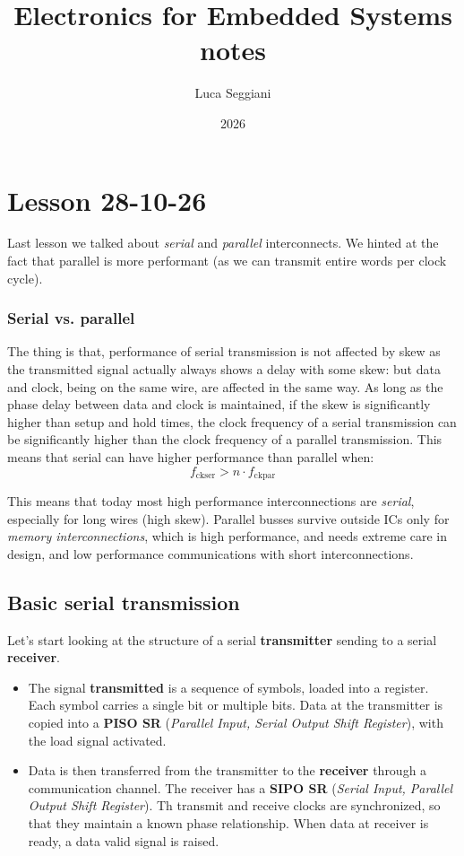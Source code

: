 \documentclass[a4paper,11pt]{article}
\title{Electronics for Embedded Systems notes}
\author{Luca Seggiani}
\date{2026}
\begin{document}
\section{Lesson 28-10-26}

\thispagestyle{empty}
\pagestyle{fancy}

Last lesson we talked about \textit{serial} and \textit{parallel} interconnects.
We hinted at the fact that parallel is more performant (as we can transmit entire words per clock cycle).

\subsubsection{Serial vs. parallel}

The thing is that, performance of serial transmission is not affected by skew as the transmitted signal actually always shows a delay with some skew: but data and clock, being on the same wire, are affected in the same way.
As long as the phase delay between data and clock is maintained, if the skew is significantly higher than setup and hold times, the clock frequency of a serial transmission can be significantly higher than the clock frequency of a parallel transmission.
This means that serial can have higher performance than parallel when:
$$
	f_\text{ckser} > n \cdot f_\text{ckpar}
$$

This means that today most high performance interconnections are \textit{serial}, especially for long wires (high skew).
Parallel busses survive outside ICs only for \textit{memory interconnections}, which is high performance, and needs extreme care in design, and low performance communications with short interconnections.

\subsection{Basic serial transmission}

Let's start looking at the structure of a serial \textbf{transmitter} sending to a serial \textbf{receiver}.

\begin{itemize}
	\item
	      The signal \textbf{transmitted} is a sequence of symbols, loaded into a register.
	      Each symbol carries a single bit or multiple bits.
	      Data at the transmitter is copied into a \textbf{PISO SR} (\textit{Parallel Input, Serial Output Shift Register}), with the load signal activated.
	\item
	      Data is then transferred from the transmitter to the \textbf{receiver} through a communication channel.
	      The receiver has a \textbf{SIPO SR} (\textit{Serial Input, Parallel Output Shift Register}).
	      Th transmit and receive clocks are synchronized, so that they maintain a known phase relationship.
	      When data at receiver is ready, a data valid signal is raised.
\end{itemize}
\end{document}
